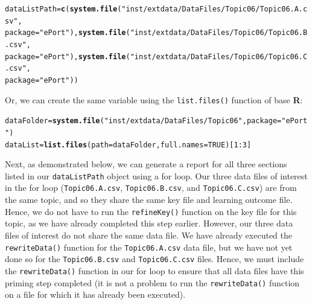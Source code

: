\documentclass[11pt,a4paper,oldfontcommands,openany]{memoir}
\makeatletter
\newcommand{\hlnum}[1]{\textcolor[rgb]{0.686,0.059,0.569}{#1}}%
\newcommand{\hlstr}[1]{\textcolor[rgb]{0.192,0.494,0.8}{#1}}%
\newcommand{\hlopt}[1]{\textcolor[rgb]{0,0,0}{#1}}%
\newcommand{\hlstd}[1]{\textcolor[rgb]{0.345,0.345,0.345}{#1}}%
\newcommand{\hlkwb}[1]{\textcolor[rgb]{0.69,0.353,0.396}{#1}}%
\newcommand{\hlkwc}[1]{\textcolor[rgb]{0.333,0.667,0.333}{#1}}%
\newcommand{\hlkwd}[1]{\textcolor[rgb]{0.737,0.353,0.396}{\textbf{#1}}}%
\newenvironment{kframe}{%
 \def\at@end@of@kframe{}%
 \ifinner\ifhmode%
  \def\at@end@of@kframe{\end{minipage}}%
  \begin{minipage}{\columnwidth}%
 \fi\fi%
 \def\FrameCommand##1{\hskip\@totalleftmargin \hskip-\fboxsep
 \colorbox{shadecolor}{##1}\hskip-\fboxsep
     \hskip-\linewidth \hskip-\@totalleftmargin \hskip\columnwidth}%
 \MakeFramed {\advance\hsize-\width
   \@totalleftmargin\z@ \linewidth\hsize
   \@setminipage}}%
 {\par\unskip\endMakeFramed%
 \at@end@of@kframe}
\newenvironment{knitrout}{}{} %
\numberwithin{equation}{section} %
\makeatother
\begin{document}
\begin{knitrout}
\color{fgcolor}\begin{kframe}
\begin{alltt}
\hlstd{dataListPath} \hlkwb{=} \hlkwd{c}\hlstd{(}\hlkwd{system.file}\hlstd{(}\hlstr{"inst/extdata/DataFiles/Topic06/Topic06.A.csv"}\hlstd{,}
  \hlkwc{package} \hlstd{=} \hlstr{"ePort"}\hlstd{),} \hlkwd{system.file}\hlstd{(}\hlstr{"inst/extdata/DataFiles/Topic06/Topic06.B.csv"}\hlstd{,}
  \hlkwc{package} \hlstd{=} \hlstr{"ePort"}\hlstd{),} \hlkwd{system.file}\hlstd{(}\hlstr{"inst/extdata/DataFiles/Topic06/Topic06.C.csv"}\hlstd{,}
  \hlkwc{package} \hlstd{=} \hlstr{"ePort"}\hlstd{))}
\end{alltt}
\end{kframe}
\end{knitrout}

Or, we can create the same variable using the \texttt{list.files()} function of base \textbf{\textsf{R}}: \\

\begin{knitrout}
\color{fgcolor}\begin{kframe}
\begin{alltt}
\hlstd{dataFolder} \hlkwb{=} \hlkwd{system.file}\hlstd{(}\hlstr{"inst/extdata/DataFiles/Topic06"}\hlstd{,} \hlkwc{package}\hlstd{=}\hlstr{"ePort"}\hlstd{)}
\hlstd{dataList} \hlkwb{=} \hlkwd{list.files}\hlstd{(}\hlkwc{path} \hlstd{= dataFolder,} \hlkwc{full.names}\hlstd{=}\hlnum{TRUE}\hlstd{)[}\hlnum{1}\hlopt{:}\hlnum{3}\hlstd{]}
\end{alltt}
\end{kframe}
\end{knitrout}

Next, as demonstrated below, we can generate a report for all three sections listed in our \texttt{dataListPath} object using a for loop. Our three data files of interest in the for loop (\texttt{Topic06.A.csv}, \texttt{Topic06.B.csv}, and \texttt{Topic06.C.csv}) are from the same topic, and so they share the same key file and learning outcome file. Hence, we do not have to run the \texttt{refineKey()} function on the key file for this topic, as we have already completed this step earlier. However, our three data files of interest do not share the same data file. We have already executed the \texttt{rewriteData()} function for the \texttt{Topic06.A.csv} data file, but we have not yet done so for the \texttt{Topic06.B.csv} and \texttt{Topic06.C.csv} files. Hence, we must include the \texttt{rewriteData()} function in our for loop to ensure that all data files have this priming step completed (it is not a problem to run the \texttt{rewriteData()} function on a file for which it has already been executed). \\
\end{document}
